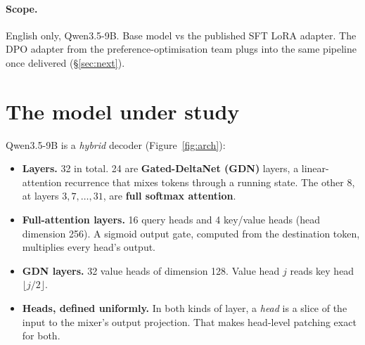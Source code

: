 \documentclass[11pt,a4paper]{article}
\begin{document}
\paragraph{Scope.} English only, Qwen3.5-9B. Base model vs the published SFT LoRA adapter. The DPO
adapter from the preference-optimisation team plugs into the same pipeline once delivered
(\S\ref{sec:next}).

\section{The model under study}
\label{sec:model}

Qwen3.5-9B is a \emph{hybrid} decoder (Figure~\ref{fig:arch}):
\begin{itemize}
  \item \textbf{Layers.} 32 in total. 24 are \textbf{Gated-DeltaNet (GDN)} layers, a linear-attention
        recurrence that mixes tokens through a running state. The other 8, at layers
        $3,7,\dots,31$, are \textbf{full softmax attention}.
  \item \textbf{Full-attention layers.} 16 query heads and 4 key/value heads (head dimension 256).
        A sigmoid output gate, computed from the destination token, multiplies every head's output.
  \item \textbf{GDN layers.} 32 value heads of dimension 128. Value head $j$ reads key head
        $\lfloor j/2\rfloor$.
  \item \textbf{Heads, defined uniformly.} In both kinds of layer, a \emph{head} is a slice of the
        input to the mixer's output projection. That makes head-level patching exact for both.
\end{itemize}
\end{document}
